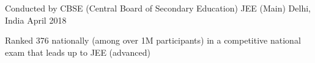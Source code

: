 \begin{cventries}
    \vspace{1ex}

  \cventry
    {Conducted by CBSE (Central Board of Secondary Education)} %
    {JEE (Main)} %
    {Delhi, India} %
    {April 2018} %
    {
      \begin{cvitems} %
        \item {Ranked 376 nationally (among over 1M participants) in a competitive national exam that leads up to JEE (advanced)}
      \end{cvitems}
    }

\end{cventries}
